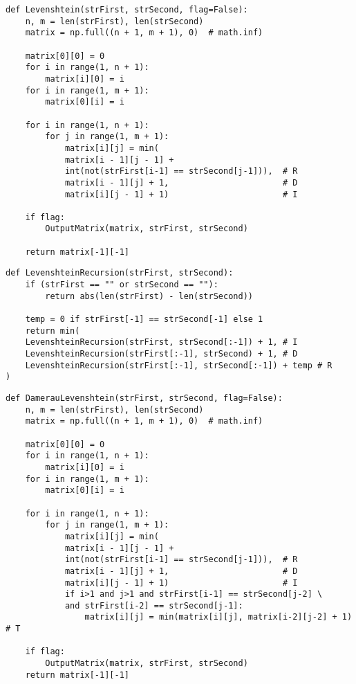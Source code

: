 \begin{lstlisting}[label=some-code,caption=Функция нахождения расстояния Левенштейна матрично]
def Levenshtein(strFirst, strSecond, flag=False):
	n, m = len(strFirst), len(strSecond)
	matrix = np.full((n + 1, m + 1), 0)  # math.inf)
	
	matrix[0][0] = 0
	for i in range(1, n + 1):
		matrix[i][0] = i
	for i in range(1, m + 1):
		matrix[0][i] = i
	
	for i in range(1, n + 1):
		for j in range(1, m + 1):
			matrix[i][j] = min(
			matrix[i - 1][j - 1] +
			int(not(strFirst[i-1] == strSecond[j-1])),  # R
			matrix[i - 1][j] + 1,                       # D
			matrix[i][j - 1] + 1)                       # I
	
	if flag:
		OutputMatrix(matrix, strFirst, strSecond)
	
	return matrix[-1][-1]
\end{lstlisting}


\begin{lstlisting}[label=some-code,caption=Рекурсивная функция нахождения расстояния Левенштейна ]
def LevenshteinRecursion(strFirst, strSecond):
	if (strFirst == "" or strSecond == ""):
		return abs(len(strFirst) - len(strSecond))
	
	temp = 0 if strFirst[-1] == strSecond[-1] else 1
	return min(
	LevenshteinRecursion(strFirst, strSecond[:-1]) + 1, # I
	LevenshteinRecursion(strFirst[:-1], strSecond) + 1, # D
	LevenshteinRecursion(strFirst[:-1], strSecond[:-1]) + temp # R
)
\end{lstlisting}


\begin{lstlisting}[label=some-code,caption=Функция нахождения расстояния Дамерау-Левенштейна матрично]
def DamerauLevenshtein(strFirst, strSecond, flag=False):
	n, m = len(strFirst), len(strSecond)
	matrix = np.full((n + 1, m + 1), 0)  # math.inf)
	
	matrix[0][0] = 0
	for i in range(1, n + 1):
		matrix[i][0] = i
	for i in range(1, m + 1):
		matrix[0][i] = i
	
	for i in range(1, n + 1):
		for j in range(1, m + 1):
			matrix[i][j] = min(
			matrix[i - 1][j - 1] +
			int(not(strFirst[i-1] == strSecond[j-1])),  # R
			matrix[i - 1][j] + 1,                       # D
			matrix[i][j - 1] + 1)                       # I
			if i>1 and j>1 and strFirst[i-1] == strSecond[j-2] \
			and strFirst[i-2] == strSecond[j-1]:
				matrix[i][j] = min(matrix[i][j], matrix[i-2][j-2] + 1) # T
	
	if flag:
		OutputMatrix(matrix, strFirst, strSecond)
	return matrix[-1][-1]

\end{lstlisting}


